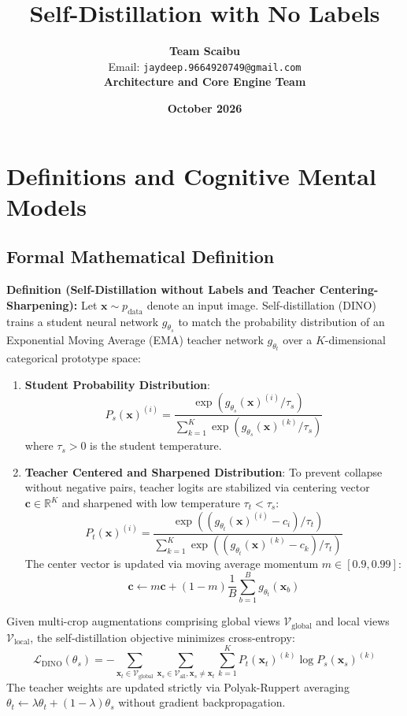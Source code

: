 \documentclass[11pt,a4paper]{article}
\title{\textbf{Self-Distillation with No Labels}}
\author{\textbf{Team Scaibu} \\ \small Email: \texttt{jaydeep.9664920749@gmail.com} \\ \small \textbf{Architecture and Core Engine Team}}
\date{\textbf{October 2026}}
\theoremstyle{definition}
\begin{document}
\maketitle

\section{Definitions and Cognitive Mental Models}

\subsection{Formal Mathematical Definition}
\textbf{Definition (Self-Distillation without Labels and Teacher Centering-Sharpening):}
Let $\mathbf{x} \sim p_{\text{data}}$ denote an input image. Self-distillation (DINO) trains a student neural network $g_{\theta_s}$ to match the probability distribution of an Exponential Moving Average (EMA) teacher network $g_{\theta_t}$ over a $K$-dimensional categorical prototype space:
\begin{enumerate}
    \item \textbf{Student Probability Distribution}:
    {\boldmath
    \begin{equation}
    P_s(\mathbf{x})^{(i)} = \frac{\exp\left( g_{\theta_s}(\mathbf{x})^{(i)} / \tau_s \right)}{\sum_{k=1}^K \exp\left( g_{\theta_s}(\mathbf{x})^{(k)} / \tau_s \right)}
    \end{equation}
    }
    where $\tau_s > 0$ is the student temperature.
    \item \textbf{Teacher Centered and Sharpened Distribution}: To prevent collapse without negative pairs, teacher logits are stabilized via centering vector $\mathbf{c} \in \mathbb{R}^K$ and sharpened with low temperature $\tau_t < \tau_s$:
    {\boldmath
    \begin{equation}
    P_t(\mathbf{x})^{(i)} = \frac{\exp\left( (g_{\theta_t}(\mathbf{x})^{(i)} - c_i) / \tau_t \right)}{\sum_{k=1}^K \exp\left( (g_{\theta_t}(\mathbf{x})^{(k)} - c_k) / \tau_t \right)}
    \end{equation}
    }
    The center vector is updated via moving average momentum $m \in [0.9, 0.99]$:
    {\boldmath
    \begin{equation}
    \mathbf{c} \gets m \mathbf{c} + (1 - m) \frac{1}{B}\sum_{b=1}^B g_{\theta_t}(\mathbf{x}_b)
    \end{equation}
    }
\end{enumerate}
Given multi-crop augmentations comprising global views $\mathcal{V}_{\text{global}}$ and local views $\mathcal{V}_{\text{local}}$, the self-distillation objective minimizes cross-entropy:
{\boldmath
\begin{equation}
\mathcal{L}_{\text{DINO}}(\theta_s) = -\sum_{\mathbf{x}_t \in \mathcal{V}_{\text{global}}} \sum_{\mathbf{x}_s \in \mathcal{V}_{\text{all}}, \mathbf{x}_s \ne \mathbf{x}_t} \sum_{k=1}^K P_t(\mathbf{x}_t)^{(k)} \log P_s(\mathbf{x}_s)^{(k)}
\end{equation}
}
The teacher weights are updated strictly via Polyak-Ruppert averaging $\theta_t \gets \lambda \theta_t + (1 - \lambda)\theta_s$ without gradient backpropagation.
\end{document}

